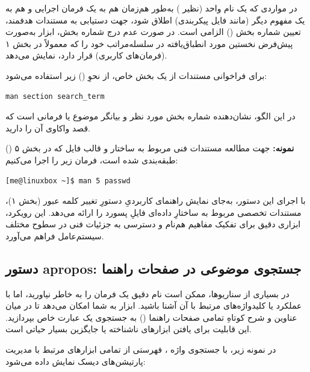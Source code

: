در مواردی که یک نام واحد (نظیر ) به‌طور هم‌زمان هم به یک فرمان اجرایی و هم به یک مفهوم دیگر (مانند فایل پیکربندی) اطلاق شود، جهت دستیابی به مستندات هدفمند، تعیین شماره بخش () الزامی است. در صورت عدم درج شماره بخش، ابزار  به‌صورت پیش‌فرض نخستین مورد انطباق‌یافته در سلسله‌مراتب خود را که معمولاً در بخش ۱ (فرمان‌های کاربری) قرار دارد، نمایش می‌دهد.

برای فراخوانی مستندات از یک بخش خاص، از نحوِ () زیر استفاده می‌شود:

\begin{latin}
\begin{lstlisting}
man section search_term
\end{lstlisting}
\end{latin}

در این الگو،  نشان‌دهنده شماره بخش مورد نظر و  بیانگر موضوع یا فرمانی است که قصد واکاوی آن را دارید.

\textbf{نمونه:} جهت مطالعه مستندات فنی مربوط به ساختار و قالب فایل  که در بخش ۵ () طبقه‌بندی شده است، فرمان زیر را اجرا می‌کنیم:

\begin{latin}
\begin{lstlisting}
[me@linuxbox ~]$ man 5 passwd
\end{lstlisting}
\end{latin}

با اجرای این دستور،  به‌جای نمایش راهنمای کاربردیِ دستورِ تغییر کلمه عبور (بخش ۱)، مستندات تخصصی مربوط به ساختارِ داده‌ای فایلِ پسورد را ارائه می‌دهد. این رویکرد، ابزاری دقیق برای تفکیک مفاهیم هم‌نام و دسترسی به جزئیات فنی در سطوح مختلف سیستم‌عامل فراهم می‌آورد.

\subsection{دستور apropos: جستجوی موضوعی در صفحات راهنما}

در بسیاری از سناریوها، ممکن است نام دقیق یک فرمان را به خاطر نیاورید، اما با عملکرد یا کلیدواژه‌های مرتبط با آن آشنا باشید. ابزار  به شما امکان می‌دهد تا در میان عناوین و شرح کوتاهِ تمامی صفحات راهنما () به جستجوی یک عبارت خاص بپردازید. این قابلیت برای یافتن ابزارهای ناشناخته یا جایگزین بسیار حیاتی است.

در نمونه زیر، با جستجوی واژه ، فهرستی از تمامی ابزارهای مرتبط با مدیریت پارتیشن‌های دیسک نمایش داده می‌شود:

